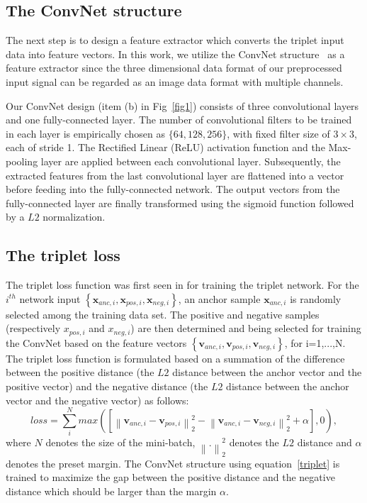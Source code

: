 \documentclass[sigconf]{acmart}
\begin{document}
\subsection{The ConvNet structure}

The next step is to design a feature extractor which converts the  triplet input data into feature vectors. In this work, we utilize the ConvNet structure~\cite{lecun1998gradient} as a feature extractor since the three dimensional data format of our preprocessed input signal can be regarded as an image data format with multiple channels. 

Our ConvNet design (item (b) in Fig~\ref{fig1}) consists of three convolutional layers and one fully-connected layer. The number of convolutional filters to be trained in each layer is empirically chosen as $\{64, 128, 256\}$, with fixed filter size of $3\times3$, each of stride 1. The Rectiﬁed Linear (ReLU) activation function and the Max-pooling layer are applied between each convolutional layer. Subsequently, the extracted features from the last convolutional layer are flattened into a vector before feeding into the fully-connected network.
The output vectors from the fully-connected layer are finally transformed using the sigmoid function followed by a $L2$ normalization.

\subsection{The triplet loss}

The triplet loss function was first seen in \cite{hoffer2015deep} for training the triplet network. For the $i^{th}$ network input $\left\{\mathbf{x}_{anc,i}, \mathbf{x}_{pos,i}, \mathbf{x}_{neg,i}\right\}$, an anchor sample $\mathbf{x}_{anc,i}$ is randomly selected among the training data set. The positive and negative samples (respectively $x_{pos,i}$ and $x_{neg,i}$) are then determined and being selected for training the ConvNet based on the feature vectors $\left\{\mathbf{v}_{anc,i},\mathbf{v}_{pos,i},\mathbf{v}_{neg,i}\right\}$, for i=1,...,N.
The triplet loss function is formulated based on a summation of the difference between the positive distance (the $L2$ distance between the anchor vector and the positive vector) and the negative distance (the $L2$ distance between the anchor vector and the negative vector) as follows:
\begin{equation}
    loss = \sum_i^N max\left({ \left[ {\left\| {{\mathbf{v}_{anc,i}} - {\mathbf{v}_{pos,i}}} \right\|_2^2} - {\left\| {{\mathbf{v}_{anc,i}} - {\mathbf{v}_{neg,i}}} \right\|_2^2}  + \alpha \right]},0 \right),\label{triplet}
\end{equation}
where $N$ denotes the size of the mini-batch, ${\left\| . \right\|_2^2}$ denotes the $L2$ distance and $\alpha$ denotes the preset margin.
The ConvNet structure using equation~\eqref{triplet} is trained to maximize the gap between the positive distance and the negative distance which should be larger than the margin $\alpha$.
\end{document}
